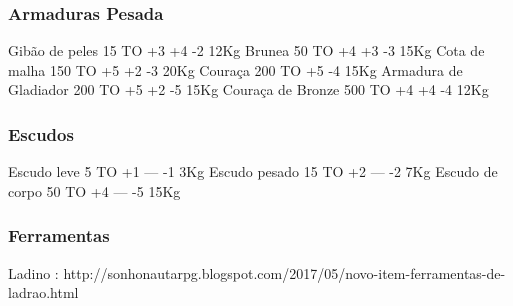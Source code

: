 \subsubsection{\label{sec:armadPesada}Armaduras Pesada}
Gibão de peles 	15 TO 	+3 	+4 	-2 	12Kg
Brunea 	50 TO 	+4 	+3 	-3 	15Kg
Cota de malha 	150 TO 	+5 	+2 	-3 	20Kg
Couraça 	200 TO 	+5 		-4 	15Kg
Armadura de Gladiador 	200 TO 	+5 	+2 	-5 	15Kg
Couraça de Bronze 	500 TO 	+4 	+4 	-4 	12Kg


\subsubsection{\label{sec:escudos}Escudos}
Escudo leve 	5 TO 	+1 	--- 	-1 	3Kg
Escudo pesado 	15 TO 	+2 	--- 	-2 	7Kg
Escudo de corpo 	50 TO 	+4 	--- 	-5 	15Kg 


\subsubsection{Ferramentas}
Ladino : http://sonhonautarpg.blogspot.com/2017/05/novo-item-ferramentas-de-ladrao.html